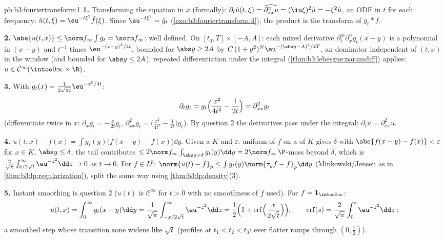\begin{solution}{pb:b3:fouriertransform:1}
\textbf{1.} Transforming the equation in $x$ (formally):
$\partial_t\hat u(t,\xi) = \widehat{\partial^2_{xx}u} =
(\iu\xi)^2\hat u = -\xi^2\hat u$, an ODE in $t$ for each
frequency: $\hat u(t,\xi) = \eu^{-t\xi^2}\hat f(\xi)$. Since
$\eu^{-t\xi^2} = \hat g_t$
(\cref{exo:b3:fouriertransform:4}), the product is the
transform of $g_t * f$.

\textbf{2.} $\abs{u(t,x)} \leq \norm f_\infty\int g_t = \norm
f_\infty$: well defined. On $[t_0, T]\times[-A, A]$: each
mixed derivative $\partial^m_t\partial^n_xg_t(x - y)$ is a
polynomial in $(x - y)$ and $t^{-1}$ times
$\eu^{-(x-y)^2/4t}$, bounded for $\abs y \geq 2A$ by
$C\,(1 + y^2)^N\eu^{-(\abs y - A)^2/4T}$, an 
dominator independent of $(t, x)$ in the window (and bounded
for $\abs y \leq 2A$): repeated differentiation under the
integral (\cref{thm:b3:lebesgue:paramdiff}) applies: $u \in
\mathcal C^\infty(\intoo0\infty\times\R)$.

\textbf{3.} With $g_t(x) = \frac1{2\sqrt{\pi
t}}\eu^{-x^2/4t}$:
\[
\partial_tg_t = g_t\Bigl(\frac{x^2}{4t^2} - \frac1{2t}\Bigr)
= \partial^2_{xx}g_t
\]
(differentiate twice in $x$: $\partial_xg_t = -\frac
x{2t}g_t$, $\partial^2_{xx}g_t = \bigl(\frac{x^2}{4t^2} -
\frac1{2t}\bigr)g_t$). By question 2 the derivatives pass
under the integral: $\partial_tu = \partial^2_{xx}u$.

\textbf{4.} $u(t,x) - f(x) = \int g_t(y)\bigl(f(x - y) -
f(x)\bigr)\dd y$. Given a  $K$ and $\varepsilon$:
uniform  of $f$ on a  of $K$ gives
$\delta$ with $\abs{f(x-y) - f(x)} < \varepsilon$ for $x \in
K$, $\abs y \leq \delta$; the tail contributes $\leq 2\norm
f_\infty\int_{\abs y > \delta}g_t(y)\dd y = 2\norm
f_\infty\,\P$-mass beyond $\delta$, which is
$\frac2{\sqrt\pi}\int_{\delta/2\sqrt t}^\infty\eu^{-z^2}\dd z
\to 0$ as $t \to 0$. For $f \in L^p$: $\norm{u(t) - f}_p \leq
\int g_t(y)\norm{\tau_yf - f}_p\dd y$ (Minkowski/Jensen as in
\cref{thm:b3:lp:regularization}), split the same way using
\cref{thm:b3:lp:density}(3).

\textbf{5.} Instant smoothing is question 2 ($u(t)$ is
$\mathcal C^\infty$ for $t > 0$ with no smoothness of $f$
used). For $f = \mathbf 1_{\intoo0\infty}$:
\[
u(t, x) = \int_0^\infty g_t(x - y)\dd y
= \frac1{\sqrt\pi}\int_{-x/2\sqrt t}^{\infty}\eu^{-z^2}\dd z
= \frac12\Bigl(1 +
\operatorname{erf}\Bigl(\frac{x}{2\sqrt t}\Bigr)\Bigr),
\qquad \operatorname{erf}(s) =
\frac2{\sqrt\pi}\int_0^s\eu^{-z^2}\dd z :
\]
a smoothed step whose transition zone widens like $\sqrt t$
(profiles at $t_1 < t_2 < t_3$: ever flatter ramps through
$(0, \frac12)$).


\end{solution}
